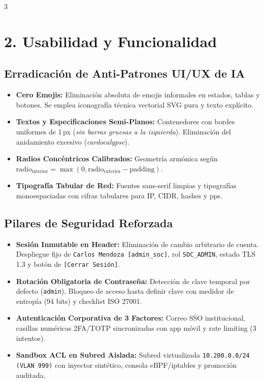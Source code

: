 \documentclass[11pt]{article}
\begin{document}
\begin{multicols}{3}
\columnbreak

\section*{\color{primary}\Large 2. Usabilidad y Funcionalidad}

\subsection*{\color{primarylight}Erradicación de Anti-Patrones UI/UX de IA}
\begin{itemize}[leftmargin=12bp, itemsep=2bp]
    \item \textbf{\color{textprimary}Cero Emojis:} Eliminación absoluta de emojis informales en estados, tablas y botones. Se emplea iconografía técnica vectorial SVG pura y texto explícito.
    \item \textbf{\color{textprimary}Textos y Especificaciones Semi-Planos:} Contenedores con bordes uniformes de 1\,px (\emph{sin barras gruesas a la izquierda}). Eliminación del anidamiento excesivo (\emph{cardocalypse}).
    \item \textbf{\color{textprimary}Radios Concéntricos Calibrados:} Geometría armónica según $\text{radio}_{\text{interior}} = \max(0, \text{radio}_{\text{exterior}} - \text{padding})$.
    \item \textbf{\color{textprimary}Tipografía Tabular de Red:} Fuentes sans-serif limpias y tipografías monoespaciadas con cifras tabulares para IP, CIDR, hashes y pps.
\end{itemize}

\subsection*{\color{primarylight}Pilares de Seguridad Reforzada}
\begin{itemize}[leftmargin=12bp, itemsep=2bp]
    \item \textbf{\color{textprimary}Sesión Inmutable en Header:} Eliminación de cambio arbitrario de cuenta. Despliegue fijo de \texttt{Carlos Mendoza [admin\_soc]}, rol \texttt{SOC\_ADMIN}, estado TLS 1.3 y botón de \texttt{[Cerrar Sesión]}.
    \item \textbf{\color{textprimary}Rotación Obligatoria de Contraseña:} Detección de clave temporal por defecto (\texttt{admin}). Bloqueo de acceso hasta definir clave con medidor de entropía (94 bits) y checklist ISO 27001.
    \item \textbf{\color{textprimary}Autenticación Corporativa de 3 Factores:} Correo SSO institucional, casillas numéricas 2FA/TOTP sincronizadas con app móvil y rate limiting (3 intentos).
    \item \textbf{\color{textprimary}Sandbox ACL en Subred Aislada:} Subred virtualizada \texttt{10.200.0.0/24 (VLAN 999)} con inyector sintético, consola eBPF/iptables y promoción auditada.
\end{itemize}


\end{multicols}
\end{document}

